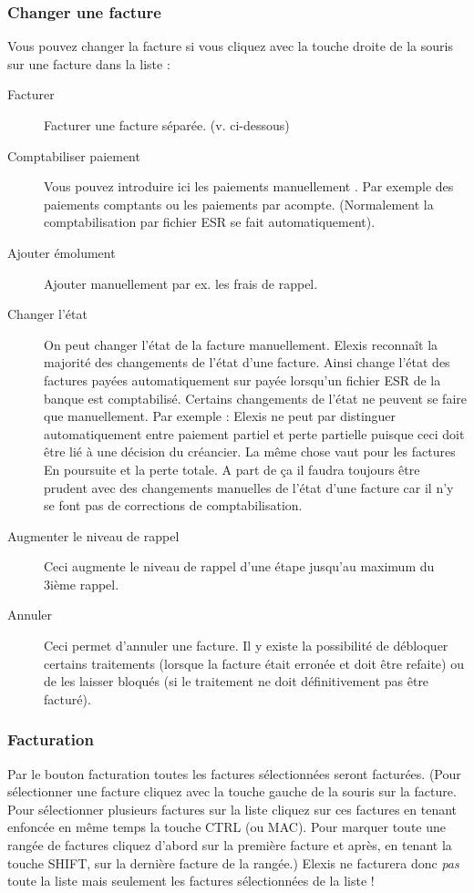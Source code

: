 \subsubsection{Changer une facture}
Vous pouvez changer la facture si vous cliquez avec la touche droite de la souris sur une facture dans la liste :
\begin{description}
\item [Facturer] Facturer une facture séparée. (v. ci-dessous)
\item [Comptabiliser paiement ] Vous pouvez introduire ici les paiements manuellement . Par exemple des paiements comptants ou les paiements par acompte. (Normalement la comptabilisation par fichier ESR se fait automatiquement).
\item [Ajouter émolument ] Ajouter manuellement par ex. les frais de rappel.
\item [Changer l'état ] On peut changer l'état de la facture manuellement. Elexis reconnaît la majorité des changements de l'état d'une facture. Ainsi change l'état des factures payées automatiquement sur  \glqq payée\grqq{} lorsqu'un fichier ESR de la banque est comptabilisé. Certains changements de l'état ne peuvent se faire que manuellement. Par exemple : Elexis ne peut par distinguer automatiquement entre \glqq paiement partiel\grqq{} et \glqq perte partielle\grqq{} puisque ceci doit être lié à une décision du créancier. La même chose vaut pour les factures \glqq En poursuite\grqq{} et la \glqq perte totale\grqq{}.
    A part de ça il faudra toujours être prudent avec des changements manuelles de l'état d'une facture car il n'y se font pas de corrections de comptabilisation.
\item [Augmenter le niveau de rappel] Ceci augmente le niveau de rappel d'une étape jusqu'au maximum du 3ième rappel.
\item [Annuler] Ceci permet d'annuler une facture. Il y existe la possibilité de débloquer certains traitements (lorsque la facture était erronée et doit être refaite) ou de les laisser bloqués (si le traitement ne doit définitivement pas être facturé).
\end{description}

\subsubsection{Facturation}
Par le bouton  \glqq facturation\grqq{} toutes les factures sélectionnées seront facturées. (Pour sélectionner une facture cliquez avec la touche gauche de la souris sur la facture. Pour sélectionner plusieurs factures sur la liste cliquez sur ces factures en tenant enfoncée en même temps la touche CTRL (ou MAC). Pour marquer toute une rangée de factures cliquez d'abord sur la première facture et après, en tenant la touche SHIFT, sur la dernière facture de la rangée.) Elexis ne facturera donc \textit{pas} toute la liste mais seulement les factures sélectionnées de la liste !


